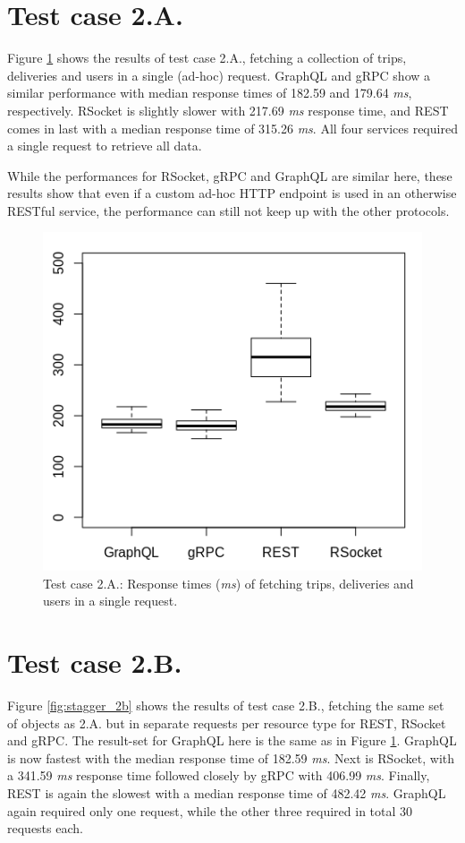 \section{Test case 2.A.}
Figure \ref{fig:stagger_2a} shows the results of test case 2.A., fetching a collection of trips, deliveries and users in a single (ad-hoc) request. GraphQL and gRPC show a similar performance with median response times of 182.59 and 179.64 \textit{ms}, respectively. RSocket is slightly slower with 217.69 \textit{ms} response time, and REST comes in last with a median response time of 315.26 \textit{ms}. All four services required a single request to retrieve all data.

While the performances for RSocket, gRPC and GraphQL are similar here, these results show that even if a custom ad-hoc HTTP endpoint is used in an otherwise RESTful service, the performance can still not keep up with the other protocols.

\begin{figure}[ht!]
    \centerline{\includegraphics[scale=0.7]{thesis_svava/images/stagger2anew.png}}
    \caption{Test case 2.A.: Response times (\textit{ms}) of fetching trips, deliveries and users in a single request.}
    \label{fig:stagger_2a}
\end{figure}

\section{Test case 2.B.}
Figure \ref{fig:stagger_2b} shows the results of test case 2.B., fetching the same set of objects as 2.A. but in separate requests per resource type for REST, RSocket and gRPC. The result-set for GraphQL here is the same as in Figure \ref{fig:stagger_2a}. GraphQL is now fastest with the median response time of 182.59 \textit{ms}. Next is RSocket, with a 341.59 \textit{ms} response time followed closely by gRPC with 406.99 \textit{ms}. Finally, REST is again the slowest with a median response time of 482.42 \textit{ms}. GraphQL again required only one request, while the other three required in total 30 requests each.

